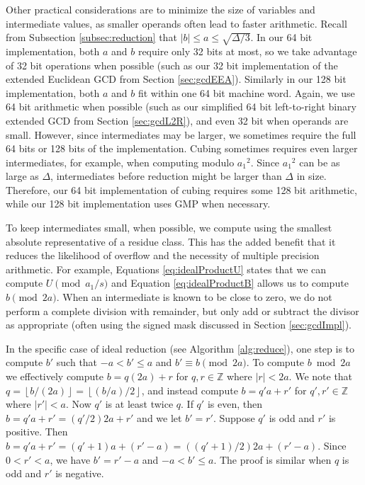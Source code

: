 \documentclass{ucalgthes1}
\theoremstyle{definition}
\newcommand{\ZZ}{\mathbb{Z}}
\newcommand{\floor}[1]{\left\lfloor #1 \right\rfloor}
\begin{document}
Other practical considerations are to minimize the size of variables and intermediate values, as smaller operands often lead to faster arithmetic.  Recall from Subsection \ref{subsec:reduction} that $|b| \le a \le \sqrt{\Delta/3}$.  In our 64 bit implementation, both $a$ and $b$ require only 32 bits at most, so we take advantage of 32 bit operations when possible (such as our 32 bit implementation of the extended Euclidean GCD from Section \ref{sec:gcdEEA}).  Similarly in our 128 bit implementation, both $a$ and $b$ fit within one 64 bit machine word.  Again, we use 64 bit arithmetic when possible (such as our simplified 64 bit left-to-right binary extended GCD from Section \ref{sec:gcdL2R}), and even 32 bit when operands are small.  However, since intermediates may be larger, we sometimes require the full 64 bits or 128 bits of the implementation.  Cubing sometimes requires even larger intermediates, for example, when computing modulo ${a_1}^2$.  Since ${a_1}^2$ can be as large as $\Delta$, intermediates before reduction might be larger than $\Delta$ in size.  Therefore, our 64 bit implementation of cubing requires some 128 bit arithmetic, while our 128 bit implementation uses GMP when necessary.

To keep intermediates small, when possible, we compute using the smallest absolute representative of a residue class.  This has the added benefit that it reduces the likelihood of overflow and the necessity of multiple precision arithmetic.  For example, Equations \ref{eq:idealProductU} states that we can compute $U \pmod {a_1/s}$ and Equation \ref{eq:idealProductB} allows us to compute $b \pmod{2a}$.  When an intermediate is known to be close to zero, we do not perform a complete division with remainder, but only add or subtract the divisor as appropriate (often using the signed mask discussed in Section \ref{sec:gcdImpl}).

In the specific case of ideal reduction (see Algorithm \ref{alg:reduce}), one step is to compute $b'$ such that $-a < b' \le a$ and $b' \equiv b \pmod{2a}$.  To compute $b \bmod{2a}$ we effectively compute $b = q(2a) + r$ for $q, r \in \ZZ$ where $|r| < 2a$.  We note that $q = \floor{b/(2a)} = \floor{(b/a)/2}$, and instead compute $b = q'a+r'$ for $q', r' \in \ZZ$ where $|r'| < a$.  Now $q'$ is at least twice $q$.  If $q'$ is even, then $b = q'a + r' = (q'/2)2a + r'$ and we let $b' = r'$. Suppose $q'$ is odd and $r'$ is positive.  Then $b = q'a + r' = (q' + 1)a + (r' - a) = ((q' + 1)/2)2a + (r' - a)$.  Since $0 < r' < a$, we have $b' = r' - a$ and $-a < b' \le a$.  The proof is similar when $q$ is odd and $r'$ is negative.
\end{document}
